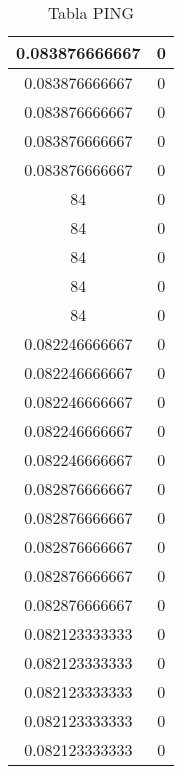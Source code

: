 \begin{table}[]
\begin{tabular}{|c|c|}
		0.083876666667          & 0                                       \\ \hline
		0.083876666667          & 0                                       \\ \hline
		0.083876666667          & 0                                       \\ \hline
		0.083876666667          & 0                                       \\ \hline
		0.083876666667          & 0                                       \\ \hline
		84                      & 0                                       \\ \hline
		84                      & 0                                       \\ \hline
		84                      & 0                                       \\ \hline
		84                      & 0                                       \\ \hline
		84                      & 0                                       \\ \hline
		0.082246666667          & 0                                       \\ \hline
		0.082246666667          & 0                                       \\ \hline
		0.082246666667          & 0                                       \\ \hline
		0.082246666667          & 0                                       \\ \hline
		0.082246666667          & 0                                       \\ \hline
		0.082876666667          & 0                                       \\ \hline
		0.082876666667          & 0                                       \\ \hline
		0.082876666667          & 0                                       \\ \hline
		0.082876666667          & 0                                       \\ \hline
		0.082876666667          & 0                                       \\ \hline
		0.082123333333          & 0                                       \\ \hline
		0.082123333333          & 0                                       \\ \hline
		0.082123333333          & 0                                       \\ \hline
		0.082123333333          & 0                                       \\ \hline
		0.082123333333          & 0                                       \\ \hline
	\end{tabular}
\caption{Tabla PING} \label{ping_tabla}
\end{table}